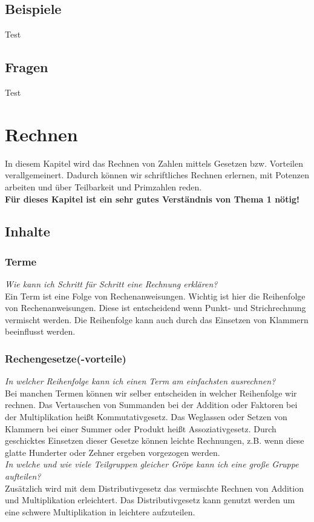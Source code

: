 \documentclass{article}
\begin{document}
\subsection{Beispiele}
\begin{tcolorbox}[colback=gray!5!white,colframe=gray!25!black]
Test
\end{tcolorbox}
\subsection{Fragen}
\begin{tcolorbox}[colback=blue!5!white,colframe=blue!25!black]
Test
\end{tcolorbox}
\newpage
\section{Rechnen}
In diesem Kapitel wird das Rechnen von Zahlen mittels Gesetzen bzw. Vorteilen verallgemeinert. Dadurch können wir schriftliches Rechnen erlernen, mit Potenzen arbeiten und über Teilbarkeit und Primzahlen reden.\\
\textbf{Für dieses Kapitel ist ein sehr gutes Verständnis von Thema 1 nötig!}
\subsection{Inhalte}
\subsubsection*{Terme}
\textit{Wie kann ich Schritt für Schritt eine Rechnung erklären?}\\
Ein Term ist eine Folge von Rechenanweisungen. Wichtig ist hier die Reihenfolge von Rechenanweisungen. Diese ist entscheidend wenn Punkt- und Strichrechnung vermischt werden. Die Reihenfolge kann auch durch das Einsetzen von Klammern beeinflusst werden.
\subsubsection*{Rechengesetze(-vorteile)}
\textit{In welcher Reihenfolge kann ich einen Term am einfachsten ausrechnen?}\\
Bei manchen Termen können wir selber entscheiden in welcher Reihenfolge wir rechnen. Das Vertauschen von Summanden bei der Addition oder Faktoren bei der Multiplikation heißt Kommutativgesetz. Das Weglassen oder Setzen von Klammern bei einer Summer oder Produkt heißt Assoziativgesetz.
Durch geschicktes Einsetzen dieser Gesetze können leichte Rechnungen, z.B. wenn diese glatte Hunderter oder Zehner ergeben vorgezogen werden. \\
\textit{In welche und wie viele Teilgruppen gleicher Gröpe kann ich eine große Gruppe aufteilen?} \\
Zusätzlich wird mit dem Distributivgesetz das vermischte Rechnen von Addition und Multiplikation erleichtert. Das Distributivgesetz kann genutzt werden um eine schwere Multiplikation in leichtere aufzuteilen.
\end{document}
